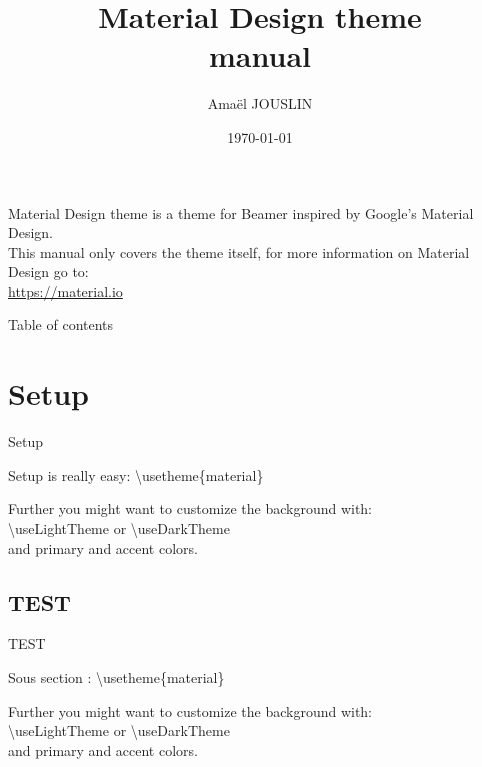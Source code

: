 \documentclass[aspectratio=43]{beamer}
\title{Material Design theme \\manual}
\date{\today}
\author[Amaël]{Amaël JOUSLIN}
\begin{document}
\begin{frame}
\titlepage
\end{frame}

\begin{frame}
\begin{card}
Material Design theme is a theme for Beamer inspired by Google's Material Design. \\[5mm]
This manual only covers the theme itself, for more information on Material Design go to: 
\\\url{https://material.io}
\end{card}
\end{frame}


\begin{frame}{Table of contents}
\begin{card}
\tableofcontents
\end{card}
\end{frame}


\section{Setup}
\begin{frame}{Setup}
\begin{card}
Setup is really easy: 
{\color{primary}\textbackslash usetheme\{material\}}
\end{card}
\begin{card}
Further you might want to customize the background with: \\[2mm]
{\color{primary}\textbackslash useLightTheme} or {\color{primary}\textbackslash useDarkTheme} \\[2mm]
and primary and accent colors.
\end{card}
\end{frame}



\subsection{TEST}
\begin{frame}{TEST}
\begin{card}
Sous section : 
{\color{primary}\textbackslash usetheme\{material\}}
\end{card}
\begin{card}
Further you might want to customize the background with: \\[2mm]
{\color{primary}\textbackslash useLightTheme} or {\color{primary}\textbackslash useDarkTheme} \\[2mm]
and primary and accent colors.
\end{card}
\end{frame}
\end{document}
